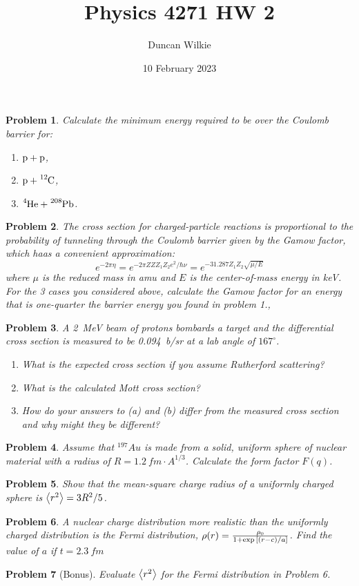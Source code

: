 \documentclass{article}
\title{Physics 4271 HW 2}
\author{Duncan Wilkie}
\date{10 February 2023}
\newtheorem{plm}{Problem}
\begin{document}
\maketitle

\begin{plm}
  Calculate the minimum energy required to be over the Coulomb barrier for:
  \begin{enumerate}
  \item $\ce{p + p}$,
  \item $\ce{p + ^{12}C}$,
  \item $\ce{^{4}He + ^{208}Pb}$.
  \end{enumerate}
\end{plm}

\begin{plm}
  The cross section for charged-particle reactions is proportional to the probability of tunneling through the Coulomb barrier
  given by the Gamow factor, which haas a convenient approximation:
  \[
    e^{-2\pi\eta} = e^{-2\pi  ZZZ_{1}Z_{2}e^{2}/\hbar\nu} = e^{-31.287Z_{1}Z_{2}\sqrt{\mu/E}}
  \]
  where $\mu$ is the reduced mass in \si{amu} and $E$ is the center-of-mass energy in \si{keV}.
  For the 3 cases you considered above, calculate the Gamow factor for an energy that is one-quarter the barrier energy you found in problem 1.,
\end{plm}

\begin{plm}
  A \SI{2}{MeV} beam of protons bombards a  target and the differential cross section is measured to be \SI{0.094}{b/sr}
  at a lab angle of $167^{\circ}$.
  \begin{enumerate}
  \item What is the expected cross section if you assume Rutherford scattering?
  \item What is the calculated Mott cross section?
  \item How do your answers to (a) and (b) differ from the measured cross section and why might they be different?
  \end{enumerate}
\end{plm}

\begin{plm}
  Assume that $^{197}Au$ is made from a solid, uniform sphere of nuclear material with a radius of $R = \SI{1.2}{fm} \cdot A^{1/3}$.
  Calculate the form factor $F(q)$.
\end{plm}

\begin{plm}
  Show that the mean-square charge radius of a uniformly charged sphere is $\expval{r^{2}} = 3R^{2}/5$.
\end{plm}

\begin{plm}
  A nuclear charge distribution more realistic than the uniformly charged distribution is the Fermi distribution,
  $\rho(r) = \frac{\rho_{0}}{1 + \exp\qty[(r - c)/a]}$.
  Find the value of $a$ if $t = \SI{2.3}{fm}$
\end{plm}

\begin{plm}[Bonus]
  Evaluate $\expval{r^{2}}$ for the Fermi distribution in Problem 6.
\end{plm}
\end{document}

